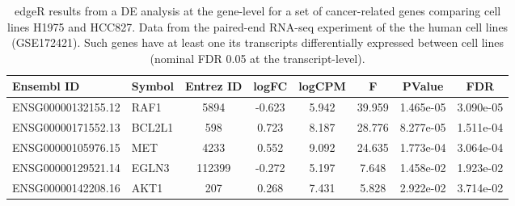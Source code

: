 \begin{table}

\caption{\label{tab:casestudy_res_txgene_targets}edgeR results from a DE analysis at the gene-level for a set of cancer-related genes comparing cell lines H1975 and HCC827. Data from the paired-end RNA-seq experiment of the the human cell lines (GSE172421). Such genes have at least one its transcripts differentially expressed between cell lines (nominal FDR 0.05 at the transcript-level).}
\centering
\fontsize{10}{12}\selectfont
\begin{tabular}[t]{llcccccc}
\toprule
Ensembl ID & Symbol & Entrez ID & logFC & logCPM & F & PValue & FDR\\
\midrule
ENSG00000132155.12 & RAF1 & 5894 & -0.623 & 5.942 & 39.959 & 1.465e-05 & 3.090e-05\\
ENSG00000171552.13 & BCL2L1 & 598 & 0.723 & 8.187 & 28.776 & 8.277e-05 & 1.511e-04\\
ENSG00000105976.15 & MET & 4233 & 0.552 & 9.092 & 24.635 & 1.773e-04 & 3.064e-04\\
ENSG00000129521.14 & EGLN3 & 112399 & -0.272 & 5.197 & 7.648 & 1.458e-02 & 1.923e-02\\
ENSG00000142208.16 & AKT1 & 207 & 0.268 & 7.431 & 5.828 & 2.922e-02 & 3.714e-02\\
\bottomrule
\end{tabular}
\end{table}
